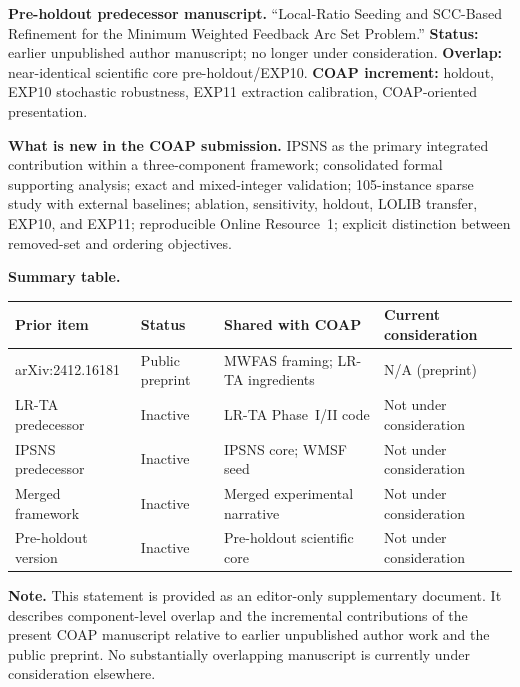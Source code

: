 \documentclass[11pt]{article}
\begin{document}
\vspace{0.5em}
\noindent
\textbf{Pre-holdout predecessor manuscript.} ``Local-Ratio Seeding and SCC-Based Refinement for the Minimum Weighted Feedback Arc Set Problem.'' \textbf{Status:} earlier unpublished author manuscript; no longer under consideration. \textbf{Overlap:} near-identical scientific core pre-holdout/EXP10. \textbf{COAP increment:} holdout, EXP10 stochastic robustness, EXP11 extraction calibration, COAP-oriented presentation.

\vspace{0.5em}
\noindent
\textbf{What is new in the COAP submission.} IPSNS as the primary integrated contribution within a three-component framework; consolidated formal supporting analysis; exact and mixed-integer validation; 105-instance sparse study with external baselines; ablation, sensitivity, holdout, LOLIB transfer, EXP10, and EXP11; reproducible Online Resource~1; explicit distinction between removed-set and ordering objectives.

\vspace{0.5em}
\noindent
\textbf{Summary table.}

\vspace{0.3em}
\begin{tabular}{@{}p{3.4cm}p{3.0cm}p{3.6cm}p{3.2cm}@{}}
\toprule
Prior item & Status & Shared with COAP & Current consideration \\
\midrule
arXiv:2412.16181 & Public preprint & MWFAS framing; LR-TA ingredients & N/A (preprint) \\
LR-TA predecessor & Inactive & LR-TA Phase~I/II code & Not under consideration \\
IPSNS predecessor & Inactive & IPSNS core; WMSF seed & Not under consideration \\
Merged framework & Inactive & Merged experimental narrative & Not under consideration \\
Pre-holdout version & Inactive & Pre-holdout scientific core & Not under consideration \\
\bottomrule
\end{tabular}

\vspace{0.5em}
\noindent
\textbf{Note.} This statement is provided as an editor-only supplementary document. It describes component-level overlap and the incremental contributions of the present COAP manuscript relative to earlier unpublished author work and the public preprint. No substantially overlapping manuscript is currently under consideration elsewhere.
\end{document}
